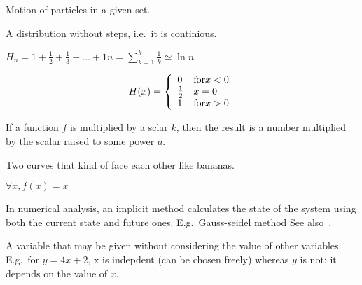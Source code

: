 \begin{definition}[Flow]
    Motion of particles in a given set.
\end{definition}

\begin{definition}
   A distribution without steps, i.e.\ it is continious. 
\end{definition}

\begin{definition}
    $H_{n} = 1 + \frac{1}{2} + \frac{1}{3} + \dots + {1}{n} =
    {\sum\limits_{k = 1}^{k}} \frac{1}{k} \simeq \ln n$
\end{definition}

\begin{definition}
    $$
    H(x) = \left\{
            \begin{array}{l l}
                0 & \text{for} x < 0 \\
                \frac{1}{2} & x = 0 \\
                1 & \text{for} x > 0 \\
            \end{array}
        \right.
    $$
\end{definition}

\begin{definition}[Homogenous]
    If a function $f$ is multiplied by a sclar $k$, then the result
    is a number multiplied by the scalar raised to some power $a$.
\end{definition}

\begin{definition}[Hyperbolic]
    Two curves that kind of face each other like bananas.
\end{definition}

\begin{definition}
    $\forall{x}, f(x) = x$
\end{definition}

\begin{definition}\label{implicitmethod}
    In numerical analysis, an implicit method calculates the state of the system
    using both the current state and future ones. E.g.\ Gauss-seidel method
    See also~.
\end{definition}

\begin{definition}
    A variable that may be given without considering the value of other
    variables. E.g.\ for $y = 4x + 2$, x is indepdent (can be chosen freely)
    whereas $y$ is not: it depends on the value of $x$.
\end{definition}


